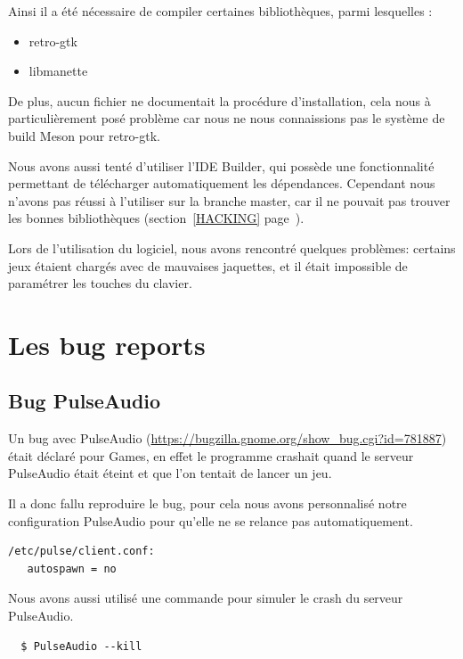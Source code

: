 \documentclass[12pt]{report}
\begin{document}
Ainsi il a été nécessaire de compiler certaines bibliothèques, parmi
lesquelles :
\begin{itemize}
\item retro-gtk
\item libmanette\\
\end{itemize}

De plus, aucun fichier ne documentait la procédure d'installation,
cela nous à particulièrement posé problème car nous ne nous
connaissions pas le système de build Meson
pour retro-gtk.

Nous avons aussi tenté d'utiliser l'IDE Builder, qui possède une
fonctionnalité permettant de télécharger automatiquement les
dépendances. Cependant nous n'avons pas réussi à l'utiliser sur la branche master,
car il ne pouvait pas trouver les bonnes bibliothèques (section~\ref{HACKING}
page~\pageref{HACKING}).

Lors de l'utilisation du logiciel, nous avons rencontré quelques
problèmes: certains jeux étaient chargés avec de mauvaises jaquettes,
et il était impossible de paramétrer les touches du clavier.

\section{Les bug reports}
\subsection{Bug PulseAudio}
\label{PulseAudio}
Un bug avec PulseAudio (\url{https://bugzilla.gnome.org/show_bug.cgi?id=781887})
était déclaré pour Games, en effet le programme crashait quand le serveur
PulseAudio était éteint et que l'on tentait de lancer un jeu.

Il a donc fallu reproduire le bug, pour cela nous avons personnalisé notre
configuration PulseAudio pour qu'elle ne se relance pas automatiquement.
\begin{verbatim}
/etc/pulse/client.conf:
   autospawn = no
\end{verbatim}

Nous avons aussi utilisé une commande pour simuler le crash du serveur PulseAudio.
\begin{verbatim}
  $ PulseAudio --kill
\end{verbatim}
\end{document}
